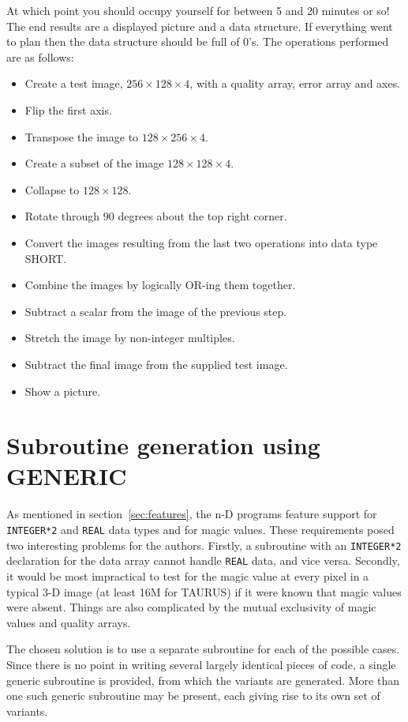 At which point you should occupy yourself for between 5 and 20 minutes or
so! The end results are a displayed picture and a data structure.
If everything went
to plan then the data structure should be full of $0$'s. The operations
performed are as follows:
\begin{itemize}
\item Create a test image, $256\times 128\times 4$, with a quality array, error
array and axes.
\item Flip the first axis.
\item Transpose the image to $128\times 256\times 4$.
\item Create a subset of the image $128\times 128\times 4$.
\item Collapse to $128\times 128$.
\item Rotate through $90$ degrees about the top right corner.
\item Convert the images resulting from the last two operations into data
type SHORT.
\item Combine the images by logically OR-ing them together.
\item Subtract a scalar from the image of the previous step.
\item Stretch the image by non-integer multiples.
\item Subtract the final image from the supplied test image.
\item Show a picture.
\end{itemize}

\section{Subroutine generation using GENERIC{}}
\label{sec:generic}

As mentioned in section~\ref{sec:features}, the n-D programs feature support for
{\tt INTEGER*2} and {\tt REAL} data types and for magic values. These
requirements posed two interesting problems for the authors. Firstly, a
subroutine with an {\tt INTEGER*2} declaration for the data array cannot
handle {\tt REAL} data, and vice versa. Secondly, it would be most impractical
to test for the magic value at every pixel in a typical 3-D image (at least 16M
for TAURUS) if it were known that magic values were absent. Things are also
complicated by the mutual exclusivity of magic values and quality arrays.

The chosen solution is to use a separate subroutine for each of the
possible cases. Since there is no point in writing several largely identical
pieces of code, a single generic subroutine is provided, from which the
variants are generated. More than one such generic subroutine may be present,
each giving rise to its own set of variants.

